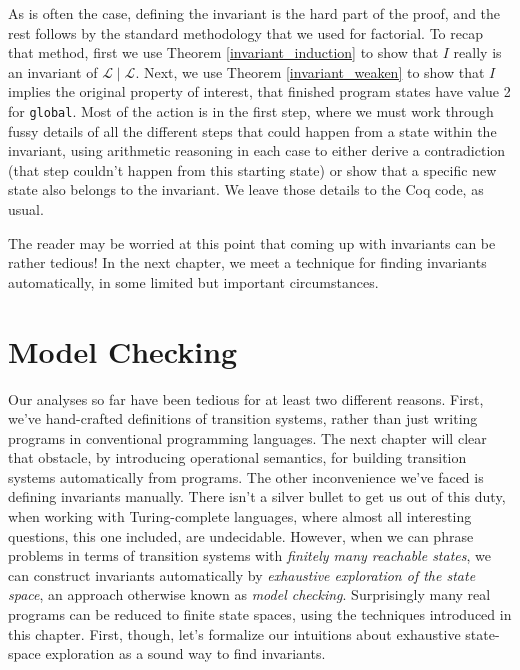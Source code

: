 \documentclass{amsbook}
\theoremstyle{definition}
\theoremstyle{remark}
\numberwithin{section}{chapter}
\numberwithin{equation}{chapter}
\begin{document}
As is often the case, defining the invariant is the hard part of the proof, and the rest follows by the standard methodology that we used for factorial.
To recap that method, first we use Theorem \ref{invariant_induction} to show that $I$ really is an invariant of $\mathcal L \mid \mathcal L$.
Next, we use Theorem \ref{invariant_weaken} to show that $I$ implies the original property of interest, that finished program states have value 2 for \texttt{global}.
Most of the action is in the first step, where we must work through fussy details of all the different steps that could happen from a state within the invariant, using arithmetic reasoning in each case to either derive a contradiction (that step couldn't happen from this starting state) or show that a specific new state also belongs to the invariant.
We leave those details to the Coq code, as usual.

The reader may be worried at this point that coming up with invariants can be rather tedious!
In the next chapter, we meet a technique for finding invariants automatically, in some limited but important circumstances.



\chapter{\label{model_checking}Model Checking}

Our analyses so far have been tedious for at least two different reasons.
First, we've hand-crafted definitions of transition systems, rather than just writing programs in conventional programming languages.
The next chapter will clear that obstacle, by introducing operational semantics, for building transition systems automatically from programs.
The other inconvenience we've faced is defining invariants manually.
There isn't a silver bullet to get us out of this duty, when working with Turing-complete languages, where almost all interesting questions, this one included, are undecidable.
However, when we can phrase problems in terms of transition systems with \emph{finitely many reachable states}, we can construct invariants automatically by \emph{exhaustive exploration of the state space}, an approach otherwise known as \emph{model checking}.
Surprisingly many real programs can be reduced to finite state spaces, using the techniques introduced in this chapter.
First, though, let's formalize our intuitions about exhaustive state-space exploration as a sound way to find invariants.
\end{document}
